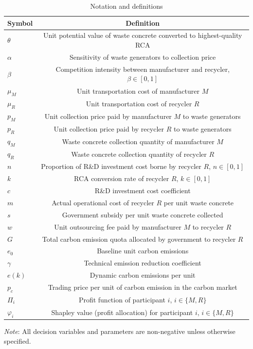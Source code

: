 \documentclass[authoryear,preprint,review,times,10pt]{elsarticle}
\begin{document}
\begin{table}[!htbp]
\centering
\captionsetup{font=normalsize, labelsep=period}
\caption{Notation and definitions}
\label{tab:notation}
\normalsize
\begin{threeparttable}
\begin{tabular*}{0.9\textwidth}{@{\extracolsep{\fill}}lc}
\toprule
\textbf{Symbol} & \textbf{Definition} \\
\midrule
$\theta$ & Unit potential value of waste concrete converted to highest-quality RCA \\
$\alpha$ & Sensitivity of waste generators to collection price \\
$\beta$ & Competition intensity between manufacturer and recycler, $\beta \in [0,1]$ \\
$\mu_M$ & Unit transportation cost of manufacturer $M$ \\
$\mu_R$ & Unit transportation cost of recycler $R$ \\
$p_M$ & Unit collection price paid by manufacturer $M$ to waste generators \\
$p_R$ & Unit collection price paid by recycler $R$ to waste generators \\
$q_M$ & Waste concrete collection quantity of manufacturer $M$ \\
$q_R$ & Waste concrete collection quantity of recycler $R$ \\
$n$ & Proportion of R\&D investment cost borne by recycler $R$, $n \in [0,1]$ \\
$k$ & RCA conversion rate of recycler $R$, $k \in [0,1]$ \\
$c$ & R\&D investment cost coefficient \\
$m$ & Actual operational cost of recycler $R$ per unit waste concrete \\
$s$ & Government subsidy per unit waste concrete collected \\
$w$ & Unit outsourcing fee paid by manufacturer $M$ to recycler $R$ \\
$G$ & Total carbon emission quota allocated by government to recycler $R$ \\
$e_0$ & Baseline unit carbon emissions \\
$\gamma$ & Technical emission reduction coefficient \\
$e(k)$ & Dynamic carbon emissions per unit \\
$p_c$ & Trading price per unit of carbon emission in the carbon market \\
$\Pi_i$ & Profit function of participant $i$, $i \in \{M,R\}$ \\
$\varphi_i$ & Shapley value (profit allocation) for participant $i$, $i \in \{M,R\}$ \\
\bottomrule
\end{tabular*}
\begin{tablenotes}[flushleft]
\small\linespread{1}\selectfont
\item \textit{Note}: All decision variables and parameters are non-negative unless otherwise specified.
\end{tablenotes}
\end{threeparttable}
\end{table}
\vspace{10pt}
\normalsize
\end{document}

